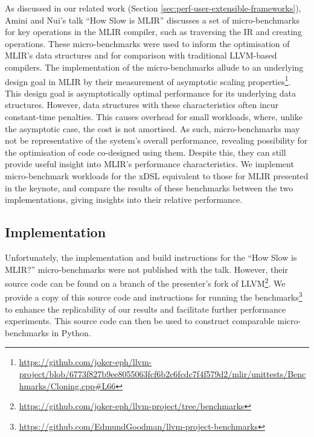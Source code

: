 As discussed in our related work (Section \ref{sec:perf-user-extensible-frameworks}), Amini and Nui's talk ``How Slow is MLIR'' \cite{aminiHowSlowMLIR2024} discusses a set of micro-benchmarks for key operations in the MLIR compiler, such as traversing the IR and creating operations.
These micro-benchmarks were used to inform the optimisation of MLIR's data structures and for comparison with traditional LLVM-based compilers. The implementation of the micro-benchmarks allude to an underlying design goal in MLIR by their measurement of asymptotic scaling properties\footnote{\url{https://github.com/joker-eph/llvm-project/blob/6773f827b9ee8055063fcf6b2c6fcdc7f4f579d2/mlir/unittests/Benchmarks/Cloning.cpp\#L66}}. This design goal is asymptotically optimal performance for its underlying data structures. However, data structures with these characteristics often incur constant-time penalties.
This causes overhead for small workloads, where, unlike the asymptotic case, the cost is not amortised. As such, micro-benchmarks may not be representative of the system's overall performance, revealing possibility for the optimisation of code co-designed using them.
Despite this, they can still provide useful insight into MLIR's performance characteristics. 
We implement micro-benchmark workloads for the xDSL equivalent to those for MLIR presented in the keynote, and compare the results of these benchmarks between the two implementations, giving insights into their relative performance.

\subsection{Implementation}
\label{ssec:ubenchmark-implementation}

Unfortunately, the implementation and build instructions for the ``How Slow is MLIR?'' micro-benchmarks were not published with the talk.
However, their source code can be found on a branch of the presenter's fork of LLVM\footnote{\url{https://github.com/joker-eph/llvm-project/tree/benchmarks}}. We provide a copy of this source code and instructions for running the benchmarks\footnote{\url{https://github.com/EdmundGoodman/llvm-project-benchmarks}} to enhance the replicability of our results and facilitate further performance experiments.
This source code can then be used to construct comparable micro-benchmarks in Python.

